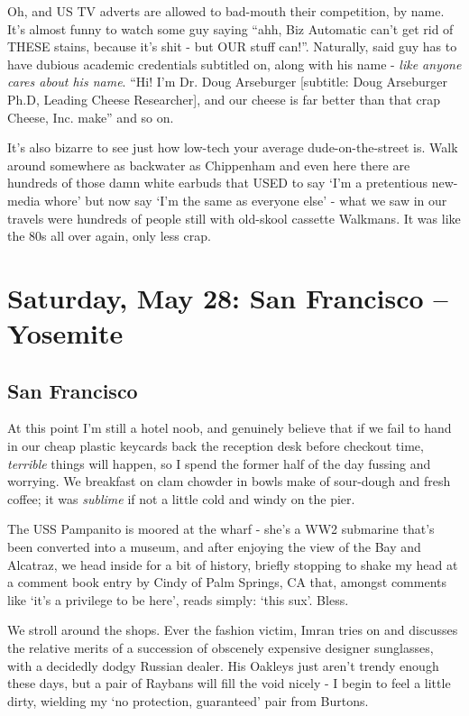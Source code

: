 \documentclass[a5paper,titlepage,draft]{book}
\begin{document}
Oh, and US TV adverts are allowed to bad-mouth their competition, by name.  It's almost funny to watch some guy saying ``ahh, Biz Automatic can't get rid of THESE stains, because it's shit - but OUR stuff can!''.  Naturally, said guy has to have dubious academic credentials subtitled on, along with his name - \emph{like anyone cares about his name}. ``Hi! I'm Dr. Doug Arseburger [subtitle: Doug Arseburger Ph.D, Leading Cheese Researcher], and our cheese is far better than that crap Cheese, Inc. make'' and so on.

It's also bizarre to see just how low-tech your average dude-on-the-street is.  Walk around somewhere as backwater as Chippenham and even here there are hundreds of those damn white earbuds that USED to say `I'm a pretentious new-media whore' but now say `I'm the same as everyone else' - what we saw in our travels were hundreds of people still with old-skool cassette Walkmans.  It was like the 80s all over again, only less crap.

\chapter[San Francisco -- Yosemite]{Saturday, May 28: San Francisco -- Yosemite}
\section*{San Francisco}
At this point I'm still a hotel noob, and genuinely believe that if we fail to hand in our cheap plastic keycards back the reception desk before checkout time, \emph{terrible} things will happen, so I spend the former half of the day fussing and worrying.  We breakfast on clam chowder in bowls make of sour-dough and fresh coffee; it was \emph{sublime} if not a little cold and windy on the pier.

The USS Pampanito is moored at the wharf - she's a WW2 submarine that's been converted into a museum, and after enjoying the view of the Bay and Alcatraz, we head inside for a bit of history, briefly stopping to shake my head at a comment book entry by Cindy of Palm Springs, CA that, amongst comments like `it's a privilege to be here', reads simply: `this sux'.  Bless.

We stroll around the shops.  Ever the fashion victim, Imran tries on and discusses the relative merits of a succession of obscenely expensive designer sunglasses, with a decidedly dodgy Russian dealer.  His Oakleys just aren't trendy enough these days, but a pair of Raybans will fill the void nicely - I begin to feel a little dirty, wielding my  `no protection, guaranteed' pair from Burtons.
\end{document}
